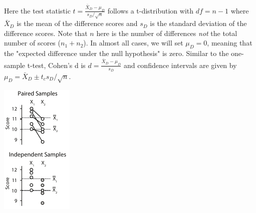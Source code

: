 \documentclass{tufte-handout}
\begin{document}
Here the test statistic $t=\frac{\bar{X}_D-\mu_D}{s_D/\sqrt{n}}$ follows a t-distribution with $df=n-1$  where $\bar{X}_D$  is the mean of the difference scores and $s_D$  is the standard deviation of the difference scores. Note that $n$  here is the number of differences \emph{not} the total number of scores ($n_1+n_2$). In almost all cases, we will set $\mu_D=0$, meaning that the "expected difference under the null hypothesis" is zero. Similar to the one-sample t-test, Cohen's d is $d=\frac{\bar{X}_D-\mu_D}{s_D}$  and confidence intervals are given by  $\mu_D=\bar{X}_D\pm t_c s_D / \sqrt{n}$.


\begin{marginfigure}
  \includegraphics[width=\linewidth]{handout3_paired_vs_indep}%

\end{marginfigure}
\end{document}
